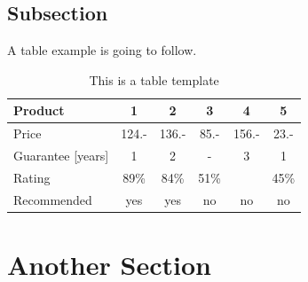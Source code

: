 \subsection{Subsection}

A table example is going to follow.

\begin{table}[H]
\centering
\caption{This is a table template}
\begin{tabular}{|l|c|c|c|c|c|}
\hline
Product & 1 & 2 & 3 & 4 & 5\\
\hline
Price & 124.- & 136.- & 85.- & 156.- & 23.-\\
Guarantee [years] & 1 & 2 & - & 3 & 1\\
Rating & 89\% & 84\% & 51\% & & 45\%\\
\hline
\hline
Recommended & yes & yes & no & no & no\\
\hline
\end{tabular}
\label{tab:template2}
\end{table}
\section{Another Section} 